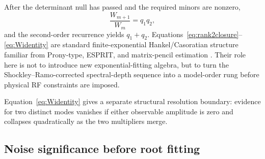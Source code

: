 \documentclass[11pt]{article}
\begin{document}
After the determinant null has passed and the required minors are nonzero,
\begin{equation}
\frac{W_{m+1}}{W_m}=q_1q_2,
\end{equation}
and the second-order recurrence yields $q_1+q_2$. Equations~\eqref{eq:rank2closure}--\eqref{eq:Widentity} are standard finite-exponential Hankel/Casoratian structure familiar from Prony-type, ESPRIT, and matrix-pencil estimation \cite{Prony1795,RoyKailath1989,HuaSarkar1990}. Their role here is not to introduce new exponential-fitting algebra, but to turn the Shockley--Ramo-corrected spectral-depth sequence into a model-order rung before physical RF constraints are imposed.

Equation~\eqref{eq:Widentity} gives a separate structural resolution boundary: evidence for two distinct modes vanishes if either observable amplitude is zero and collapses quadratically as the two multipliers merge.

\subsection{Noise significance before root fitting}
\end{document}
